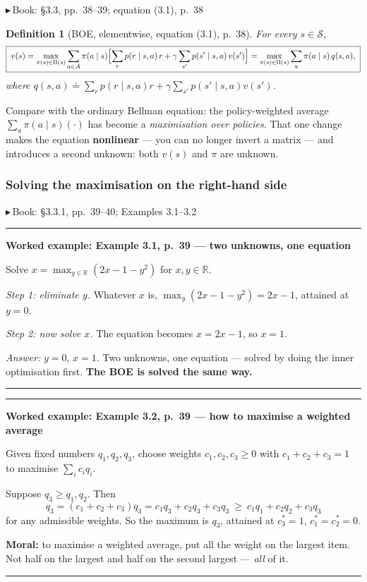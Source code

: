 \documentclass[11pt, letterpaper]{article}
\theoremstyle{runin}
\newtheorem*{definition}{Definition}
\theoremstyle{runinplain}
\theoremstyle{remark}
\newcommand{\R}{\mathbb{R}}
\newcommand{\Sspace}{\mathcal{S}}
\newcommand{\Aspace}{\mathcal{A}}
\newcommand{\bk}[1]{{\color{bookblue}\small$\blacktriangleright$\,\textsf{Book: #1}}}
\newenvironment{worked}[1]
  {\par\medskip\noindent\rule{\textwidth}{0.4pt}\par\nobreak\vspace{0.3em}
   \noindent\textbf{Worked example: #1}\par\nobreak\vspace{0.2em}\small}
  {\par\nobreak\vspace{0.3em}\noindent\rule{\textwidth}{0.4pt}\par\medskip}
\begin{document}
\bk{\S3.3, pp.~38--39; equation (3.1), p.~38}

\begin{definition}[BOE, elementwise, equation (3.1), p.~38]
For every $s\in\Sspace$,
\[
  \boxed{\;
  v(s)=\max_{\pi(s)\in\Pi(s)}\sum_{a\in\Aspace}\pi(a\mid s)
  \Bigl[\sum_{r}p(r\mid s,a)\,r+\gamma\sum_{s'}p(s'\mid s,a)\,v(s')\Bigr]
  =\max_{\pi(s)\in\Pi(s)}\sum_{a}\pi(a\mid s)\,q(s,a),
  \;}
\]
where $q(s,a)\doteq\sum_r p(r\mid s,a)r+\gamma\sum_{s'}p(s'\mid s,a)v(s')$.
\end{definition}

Compare with the ordinary Bellman equation: the policy-weighted average
$\sum_a\pi(a\mid s)(\cdot)$ has become a \emph{maximisation over policies}. That
one change makes the equation \textbf{nonlinear} --- you can no longer invert a
matrix --- and introduces a second unknown: both $v(s)$ and $\pi$ are unknown.

\subsubsection{Solving the maximisation on the right-hand side}

\bk{\S3.3.1, pp.~39--40; Examples 3.1--3.2}

\begin{worked}{Example 3.1, p.~39 --- two unknowns, one equation}
Solve $x=\max_{y\in\R}(2x-1-y^2)$ for $x,y\in\R$.

\emph{Step 1: eliminate $y$.} Whatever $x$ is, $\max_y(2x-1-y^2)=2x-1$, attained at
$y=0$.

\emph{Step 2: now solve $x$.} The equation becomes $x=2x-1$, so $x=1$.

\emph{Answer:} $y=0$, $x=1$. Two unknowns, one equation --- solved by doing the
inner optimisation first. \textbf{The BOE is solved the same way.}
\end{worked}

\begin{worked}{Example 3.2, p.~39 --- how to maximise a weighted average}
Given fixed numbers $q_1,q_2,q_3$, choose weights $c_1,c_2,c_3\ge0$ with
$c_1+c_2+c_3=1$ to maximise $\sum_i c_iq_i$.

Suppose $q_3\ge q_1,q_2$. Then
\[
  q_3=(c_1+c_2+c_3)q_3=c_1q_3+c_2q_3+c_3q_3\ \ge\ c_1q_1+c_2q_2+c_3q_3
\]
for any admissible weights. So the maximum is $q_3$, attained at $c_3^*=1$,
$c_1^*=c_2^*=0$.

\textbf{Moral:} to maximise a weighted average, put all the weight on the largest
item. Not half on the largest and half on the second largest --- \emph{all} of it.
\end{worked}
\end{document}
